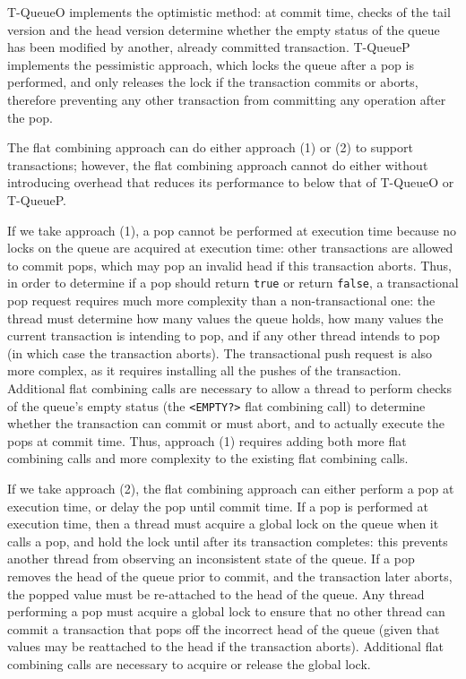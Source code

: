 T-QueueO implements the optimistic method: at commit time, checks of the tail version and the head version determine whether the empty status of the queue has been modified by another, already committed transaction. T-QueueP implements the pessimistic approach, which locks the queue after a pop is performed, and only releases the lock if the transaction commits or aborts, therefore preventing any other transaction from committing any operation after the pop.

The flat combining approach can do either approach (1) or (2) to support transactions; however, the flat combining approach cannot do either without introducing overhead that reduces its performance to below that of T-QueueO or T-QueueP.

If we take approach (1), a pop cannot be performed at execution time because no locks on the queue are acquired at execution time: other transactions are allowed to commit pops, which may pop an invalid head if this transaction aborts. Thus, in order to determine if a pop should return \texttt{true} or return \texttt{false}, a transactional pop request requires much more complexity than a non-transactional one: the thread must determine how many values the queue holds, how many values the current transaction is intending to pop, and if any other thread intends to pop (in which case the transaction aborts). The transactional push request is also more complex, as it requires installing all the pushes of the transaction. Additional flat combining calls are necessary to allow a thread to perform checks of the queue's empty status (the \texttt{<EMPTY?>} flat combining call) to determine whether the transaction can commit or must abort, and to actually execute the pops at commit time. Thus, approach (1) requires adding both more flat combining calls and more complexity to the existing flat combining calls.

If we take approach (2), the flat combining approach can either perform a pop at execution time, or delay the pop until commit time. If a pop is performed at execution time, then a thread must acquire a global lock on the queue when it calls a pop, and hold the lock until after its transaction completes: this prevents another thread from observing an inconsistent state of the queue. If a pop removes the head of the queue prior to commit, and the transaction later aborts, the popped value must be re-attached to the head of the queue. Any thread performing a pop must acquire a global lock to ensure that no other thread can commit a transaction that pops off the incorrect head of the queue (given that values may be reattached to the head if the transaction aborts). Additional flat combining calls are necessary to acquire or release the global lock. 

